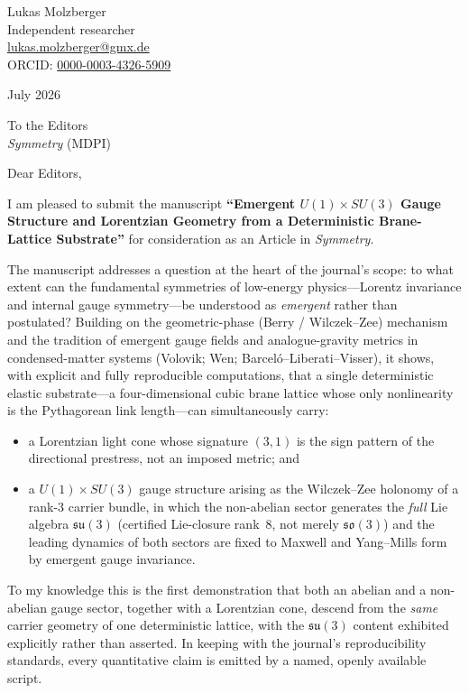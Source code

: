 \documentclass[10pt]{article}
\begin{document}
\noindent
Lukas Molzberger \\
Independent researcher \\
\href{mailto:lukas.molzberger@gmx.de}{lukas.molzberger@gmx.de} \\
ORCID: \href{https://orcid.org/0000-0003-4326-5909}{0000-0003-4326-5909}

\vspace{0.5em}
 July 2026

\vspace{0.5em}
\noindent
To the Editors \\
\textit{Symmetry} (MDPI)

\vspace{0.5em}
\noindent Dear Editors,

I am pleased to submit the manuscript \textbf{``Emergent $U(1)\times SU(3)$ Gauge
Structure and Lorentzian Geometry from a Deterministic Brane-Lattice Substrate''}
for consideration as an Article in \textit{Symmetry}.

The manuscript addresses a question at the heart of the journal's scope: to what
extent can the fundamental symmetries of low-energy physics---Lorentz invariance and
internal gauge symmetry---be understood as \emph{emergent} rather than postulated?
Building on the geometric-phase (Berry / Wilczek--Zee) mechanism and the tradition of
emergent gauge fields and analogue-gravity metrics in condensed-matter systems
(Volovik; Wen; Barcel\'o--Liberati--Visser), it shows, with explicit and fully
reproducible computations, that a single deterministic elastic substrate---a
four-dimensional cubic brane lattice whose only nonlinearity is the Pythagorean link
length---can simultaneously carry:

\begin{itemize}
  \item a Lorentzian light cone whose signature $(3,1)$ is the sign pattern of the
  directional prestress, not an imposed metric; and
  \item a $U(1)\times SU(3)$ gauge structure arising as the Wilczek--Zee holonomy of a
  rank-3 carrier bundle, in which the non-abelian sector generates the \emph{full}
  Lie algebra $\mathfrak{su}(3)$ (certified Lie-closure rank~8, not merely
  $\mathfrak{so}(3)$) and the leading dynamics of both sectors are fixed to Maxwell
  and Yang--Mills form by emergent gauge invariance.
\end{itemize}

To my knowledge this is the first demonstration that both an abelian and a
non-abelian gauge sector, together with a Lorentzian cone, descend from the
\emph{same} carrier geometry of one deterministic lattice, with the
$\mathfrak{su}(3)$ content exhibited explicitly rather than asserted. In keeping with
the journal's reproducibility standards, every quantitative claim is emitted by a
named, openly available script.
\end{document}
